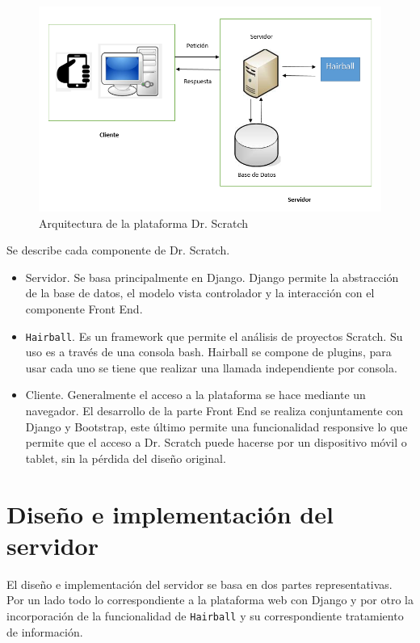 \documentclass[a4paper, 12pt]{book}
\begin{document}
\begin{figure}
  \centering
	\graphicspath{{img/}}
  \includegraphics[bb=0 0 800 600, width=14cm, keepaspectratio]{arquitecturascratch.png}
	\caption{Arquitectura de la plataforma Dr. Scratch}
  \label{figura:foro_hilos}
\end{figure}

Se describe cada componente de Dr. Scratch.

\begin{itemize}
  \item Servidor. Se basa principalmente en Django. Django permite la abstracción de la
	base de datos, el modelo vista controlador y la interacción con el componente Front End.
  \item \texttt{Hairball}. Es un framework que permite el análisis de proyectos Scratch. Su uso es
	a través de una consola bash. Hairball se compone de plugins, para usar cada uno se
	tiene que realizar una llamada independiente por consola.
  \item Cliente. Generalmente el acceso a la plataforma se hace mediante un navegador. El
	desarrollo de la parte Front End se realiza conjuntamente con Django y Bootstrap, este
	último permite una funcionalidad responsive lo que permite que el acceso a Dr. Scratch
	puede hacerse por un dispositivo móvil o tablet, sin la pérdida del diseño original. 
\end{itemize}



\section{Diseño e implementación del servidor}
\label{sec:servidor}

El diseño e implementación del servidor se basa en dos partes representativas. Por un lado todo lo
correspondiente a la plataforma web con Django y por otro la incorporación de la funcionalidad de
\texttt{Hairball} y su correspondiente tratamiento de información. \\
\end{document}
